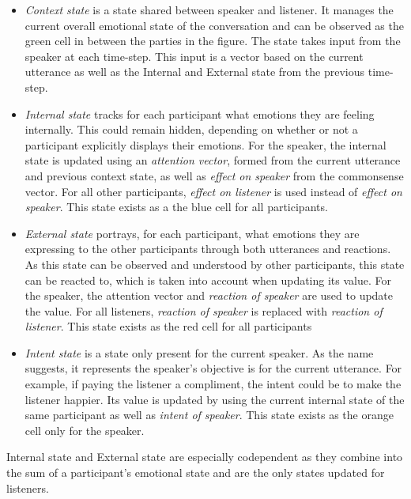 \documentclass[nofilelist]{cslthse-msc}
\begin{document}
\begin{itemize}
    \item \textit{Context state} is a state shared between speaker and listener. It manages the current overall emotional state of the conversation and can be observed as the green cell in between the parties in the figure. The state takes input from the speaker at each time-step. This input is a vector based on the current utterance as well as the Internal and External state from the previous time-step.
    
    \item \textit{Internal state} tracks for each participant what emotions they are feeling internally. This could remain hidden, depending on whether or not a participant explicitly displays their emotions. For the speaker, the internal state is updated using an \textit{attention vector}, formed from the current utterance and previous context state, as well as \textit{effect on speaker} from the commonsense vector. For all other participants, \textit{effect on listener} is used instead of \textit{effect on speaker}. This state exists as a the blue cell for all participants.
    
    \item \textit{External state} portrays, for each participant, what emotions they are expressing to the other participants through both utterances and reactions. As this state can be observed and understood by other participants, this state can be reacted to, which is taken into account when updating its value. For the speaker, the attention vector and \textit{reaction of speaker} are used to update the value. For all listeners, \textit{reaction of speaker} is replaced with \textit{reaction of listener}. This state exists as the red cell for all participants
    
    \item \textit{Intent state} is a state only present for the current speaker. As the name suggests, it represents the speaker's objective is for the current utterance. For example, if paying the listener a compliment, the intent could be to make the listener happier. Its value is updated by using the current internal state of the same participant as well as \textit{intent of speaker}. This state exists as the orange cell only for the speaker.
    
\end{itemize}
Internal state and External state are especially codependent as they combine into the sum of a participant's emotional state and are the only states updated for listeners. 
\end{document}
